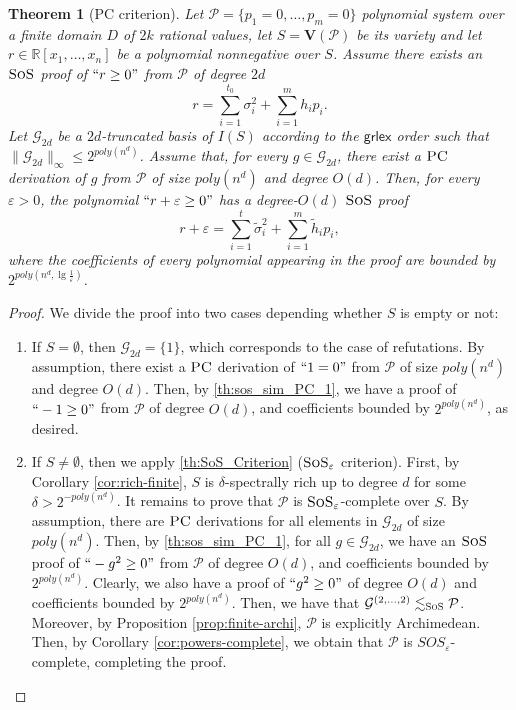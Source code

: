 \documentclass[11pt]{article}
\newcommand{\sos}{\text{\sc{SoS}}}
\newcommand{\PC}{\textsc{PC}}
\newcommand{\grlexns}{\textsf{grlex}}
\newcommand{\Variety}[1]{{\textbf{V}}\left( #1 \right)}
\newcommand{\1}{\textbf{1}}
\newcommand{\GB}{\text{Gr\"{o}bner} }
\newtheorem{theorem}{Theorem}[section]
\begin{document}
\begin{theorem}[PC criterion]\label{th:PC_criterion}
    Let $\mathcal{P} = \{p_1 = 0, \dots, p_m = 0\}$ polynomial system over a finite domain $D$ of $2k$ rational values, let $S=\Variety{\mathcal{P}}$ be its variety and let $r\in\mathbb{R}[x_1, \dots, x_n]$ be a polynomial nonnegative over $S$. Assume there exists an $\sos$ proof of $``r\geq 0"$ from $\mathcal{P}$ of degree $2d$
  \begin{equation*}
        r = \sum_{i=1}^{t_0} \sigma_i^2 + \sum_{i=1}^m h_i p_i.
    \end{equation*}
   Let $\mathcal{G}_{2d}$ be a $2d$-truncated \GB basis of $I(S)$ according to the $\grlexns$ order such that $\|\mathcal{G}_{2d}\|_{\infty}\leq 2^{poly(n^d)}$. Assume that, for every $g\in \mathcal{G}_{2d}$, there exist a $\PC$ derivation of $g$ from $\mathcal{P}$ of size $poly(n^d)$ and degree $O(d)$. Then, for every $\varepsilon>0$, the polynomial $``r+\varepsilon \geq 0"$ has a degree-$O(d)$ $\sos$ proof
    \begin{equation*}
        r +\varepsilon = \sum_{i=1}^{t} \tilde{\sigma}_i^2 + \sum_{i=1}^m \tilde{h}_i p_i,
    \end{equation*}
    where the coefficients of every polynomial appearing in the proof are bounded by $2^{poly(n^d, \lg \frac{1}{\varepsilon})}$.   
\end{theorem}

\begin{proof}
    We divide the proof into two cases depending whether $S$ is empty or not: 
    \begin{enumerate}
        \item If $S = \emptyset$, then $\mathcal{G}_{2d} = \{ 1 \}$, which corresponds to the case of refutations. By assumption, there exist a $\PC$ derivation of $``1=0"$ from $\mathcal{P}$ of size $poly(n^d)$ and degree $O(d)$. Then, by \cref{th:sos_sim_PC_1}, we have a proof of $``-1\geq 0"$ from $\mathcal{P}$ of degree $O(d)$, and coefficients bounded by $2^{poly(n^d)}$, as desired.
        \item If $S\neq \emptyset$, then we apply \cref{th:SoS_Criterion} ($\sos_\varepsilon$ criterion). First, by Corollary \ref{cor:rich-finite}, $S$ is $\delta$-spectrally rich up to degree $d$ for some $\delta>2^{-poly(n^d)}$. It remains to prove that $\mathcal{P}$ is $\sos_{\varepsilon}$-complete over $S$. By assumption, there are $\PC$ derivations for all elements in $\mathcal G_{2d}$ of size $poly(n^d)$. Then, by \cref{th:sos_sim_PC_1}, for all $g\in \mathcal{G}_{2d}$, we have an $\sos$ proof of $``-g^2\geq 0"$ from $\mathcal{P}$ of degree $O(d)$, and coefficients bounded by $2^{poly(n^d)}$. Clearly, we also have a proof of $``g^2\geq 0"$ of degree $O(d)$ and coefficients bounded by $2^{poly(n^d)}$. Then, we have that $\mathcal{G}^{(2, \dots, 2)}\lesssim_{\sos} \mathcal{P}$. Moreover, by Proposition \ref{prop:finite-archi}, $\mathcal{P}$ is explicitly Archimedean. Then, by Corollary \ref{cor:powers-complete}, we obtain that $\mathcal{P}$ is $SOS_{\varepsilon}$-complete, completing the proof.
        \end{enumerate}
\end{proof}
\end{document}
